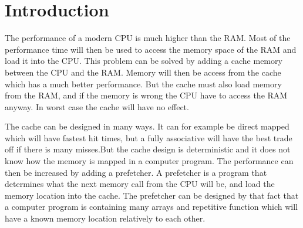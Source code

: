 \section*{Introduction}
The performance of a modern CPU is much higher than the RAM. Most of the performance time will then be used to access the memory space of the RAM and load it into the CPU. This problem can be solved by adding a cache memory between the CPU and the RAM. Memory will then be access from the cache which has a much better performance. But the cache must also load memory from the RAM, and if the memory is wrong the CPU have to access the RAM anyway. In worst case the cache will have no effect.

The cache can be designed in many ways. It can for example be direct mapped which will have fastest hit times, but a fully associative will have the best trade off if there is many misses.But the cache design is deterministic and it does not know how the memory is mapped in a computer program. The performance can then be increased by adding a prefetcher. A prefetcher is a program that determines what the next memory call from the CPU will be, and load the memory location into the cache. The prefetcher can be designed by that fact that a computer program is containing many arrays and repetitive function which will have a known memory location relatively to each other.
